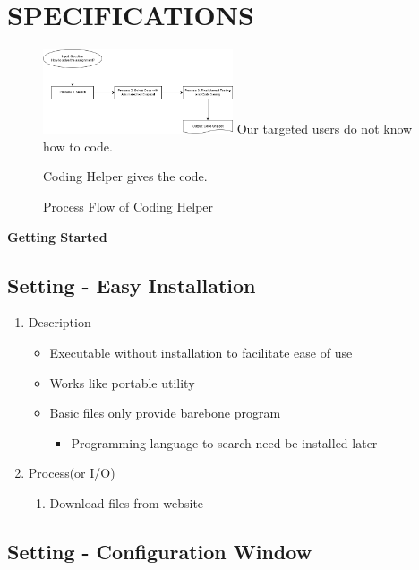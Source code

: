 \documentclass[conference]{IEEEtran}
\begin{document}
\section{SPECIFICATIONS} %
\label{sec:specificatisons}

\begin{figure}[ht]
\centering
\includegraphics[width=0.5\textwidth]{./figures/Process_Flow.png}
Our targeted users do not know how to code.

Coding Helper gives the code.
\caption{Process Flow of Coding Helper}
\label{fig_process_flow}
\end{figure}


\textbf{Getting Started}

\subsection{Setting - Easy Installation}

\begin{enumerate}
  \item Description
  \begin{itemize}
    \item Executable without installation to facilitate ease of use
    \item Works like portable utility
    \item Basic files only provide barebone program
    \begin{itemize}
      \item Programming language to search need be installed later
    \end{itemize}
  \end{itemize}
  \item Process(or I/O)
  \begin{enumerate}
    \item Download files from website
  \end{enumerate}
\end{enumerate}
\textit{}


\subsection{Setting - Configuration Window}
\end{document}
